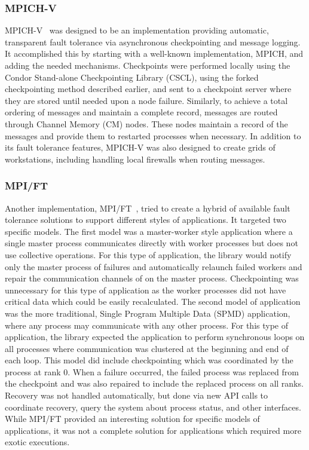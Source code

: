 \subsubsection{MPICH-V}

MPICH-V~\cite{Bosilca:vy} was designed to be an \mpi implementation providing 
automatic, transparent fault tolerance via asynchronous checkpointing and message 
logging. It accomplished this by starting with a well-known implementation, MPICH, and 
adding the needed mechanisms. Checkpoints were performed locally using the Condor 
Stand-alone Checkpointing Library (CSCL), using the forked checkpointing method 
described earlier, and sent to a checkpoint server where they are stored until needed 
upon a node failure. Similarly, to achieve a total ordering of messages and maintain a 
complete record, messages are routed through Channel Memory (CM) nodes. These nodes 
maintain a record of the messages and provide them to restarted processes when 
necessary. In addition to its fault tolerance features, MPICH-V was also designed to 
create grids of workstations, including handling local firewalls when routing messages.

\subsubsection{MPI/FT}

Another \mpi implementation, MPI/FT~\cite{Batchu:2004wm}, tried to create a hybrid of 
available fault tolerance solutions to support different styles of applications. It 
targeted two specific models. The first model was a master-worker style application 
where a single master process communicates directly with worker processes but does not 
use collective operations. For this type of application, the \mpi library would notify 
only the master process of failures and automatically relaunch failed workers and 
repair the communication channels of  on the master process. 
Checkpointing was unnecessary for this type of application as the worker processes did 
not have critical data which could be easily recalculated. The second model of 
application was the more traditional, Single Program Multiple Data (SPMD) application, where any 
process may communicate with any other process. For this type of application, the \mpi 
library expected the application to perform synchronous loops on all processes where 
communication was clustered at the beginning and end of each loop. This model did 
include checkpointing which was coordinated by the process at rank 0. When a failure 
occurred, the failed process was replaced from the checkpoint and 
 was also repaired to include the replaced process on all 
ranks. Recovery was not handled automatically, but done via new API calls to 
coordinate recovery, query the system about process status, and other interfaces. While 
MPI/FT provided an interesting solution for specific models of applications, it was not 
a complete solution for applications which required more exotic executions.


